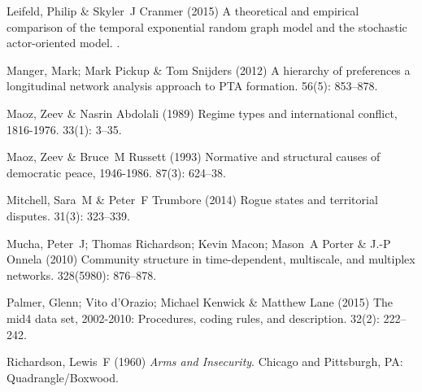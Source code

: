 \documentclass[3p,times,twocolumn,authoryear,12pt]{elsarticle}
\begin{document}
\begin{thebibliography}{}
Leifeld, Philip  \& Skyler~J Cranmer (2015) A theoretical and empirical
  comparison of the temporal exponential random graph model and the stochastic
  actor-oriented model.
.

Manger, Mark; Mark Pickup  \& Tom Snijders (2012) A hierarchy of preferences a
  longitudinal network analysis approach to {PTA} formation.
 { 56\/}(5): 853--878.

Maoz, Zeev  \& Nasrin Abdolali (1989) Regime types and international conflict,
  1816-1976.
 { 33\/}(1): 3--35.

Maoz, Zeev  \& Bruce~M Russett (1993) Normative and structural causes of
  democratic peace, 1946-1986.
 { 87\/}(3): 624--38.

Mitchell, Sara~M  \& Peter~F Trumbore (2014) Rogue states and territorial
  disputes.
 { 31\/}(3): 323--339.

Mucha, Peter~J; Thomas Richardson; Kevin Macon; Mason~A Porter  \& J.-P Onnela
  (2010) Community structure in time-dependent, multiscale, and multiplex
  networks.
 { 328\/}(5980): 876--878.

Palmer, Glenn; Vito d'Orazio; Michael Kenwick  \& Matthew Lane (2015) The mid4
  data set, 2002-2010: Procedures, coding rules, and description.
 { 32\/}(2): 222--242.

Richardson, Lewis~F (1960) {\em Arms and Insecurity}.
\newblock Chicago and Pittsburgh, PA: Quadrangle/Boxwood.


\end{thebibliography}
\end{document}
